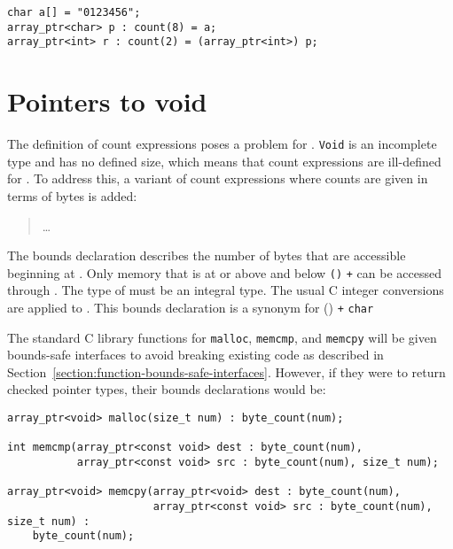 \begin{verbatim}
char a[] = "0123456";
array_ptr<char> p : count(8) = a;
array_ptr<int> r : count(2) = (array_ptr<int>) p;
\end{verbatim}

\section{Pointers to void}
\label{section:pointers-to-void}

The definition of count expressions poses a problem for
\arrayptrvoid. \texttt{Void} is an
incomplete type and has no defined size, which means that count
expressions are ill-defined for
\arrayptrvoid. To address this, a
variant of count expressions where counts are given in terms of bytes is
added:


\begin{quote}
\ldots{}

\end{quote}

The bounds declaration 
describes the number of bytes that are accessible beginning at . 
Only memory that is at or above  and below \texttt{(\arrayptrchar)}
 \texttt{+}  can be accessed through . The type
of  must be an integral type.  The usual C integer conversions are
applied to .  This bounds declaration is a synonym for 
           {
                      {(\arrayptrchar)  \texttt{+} }
                      {\texttt{char}}}

The standard C library functions for \texttt{malloc}, \texttt{memcmp}, and
\texttt{memcpy} will be
given bounds-safe interfaces to avoid breaking existing code as
described in Section~\ref{section:function-bounds-safe-interfaces}. 
However, if they were to return checked pointer
types, their bounds declarations would be:

\begin{verbatim}
array_ptr<void> malloc(size_t num) : byte_count(num);

int memcmp(array_ptr<const void> dest : byte_count(num),
           array_ptr<const void> src : byte_count(num), size_t num);

array_ptr<void> memcpy(array_ptr<void> dest : byte_count(num),
                       array_ptr<const void> src : byte_count(num), size_t num) :
    byte_count(num);
\end{verbatim}

